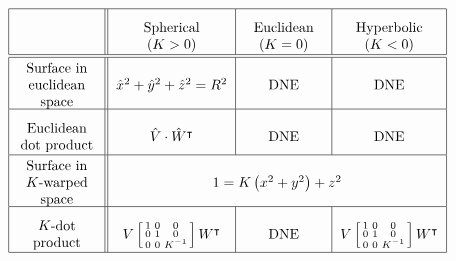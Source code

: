 \documentclass{ximera}
\begin{document}
\[
{\renewcommand{\arraystretch}{2.7}
  \begin{tabular}{|c||c|c|c|}\hline
    & \begin{minipage}{2cm}\begin{center}Spherical ($K>0$)\end{center}\end{minipage} & \begin{minipage}{2cm}\begin{center}Euclidean ($K=0$)\end{center}\end{minipage} & \begin{minipage}{2cm}\begin{center}Hyperbolic ($K<0$)\end{center}\end{minipage}\\\hline\hline
    \begin{minipage}{2cm}\begin{center}Surface in \\ euclidean space\end{center}\end{minipage} & $\hat{x}^{2}+\hat{y}^{2}+\hat{z}^{2}=R^{2}$ & DNE  & DNE \\\hline
    \begin{minipage}{2cm}\begin{center}Euclidean dot product\end{center}\end{minipage} & $\hat{V}\cdot \hat{W}^\transpose$ & DNE  & DNE\\\hline
     \begin{minipage}{2cm}\begin{center}Surface in $K$-warped space\end{center}\end{minipage} & \multicolumn{3}{c|}{$1=K\left(  x^{2}+y^{2}\right)  +z^{2}$}\\\hline
     \begin{minipage}{2cm}\begin{center}$K$-dot product\end{center}\end{minipage} & $V\left[\begin{smallmatrix}1 & 0 & 0\\ 0 & 1 & 0\\ 0 & 0 & K^{-1}\end{smallmatrix}\right] W^\transpose$ &  DNE & $V\left[\begin{smallmatrix}1 & 0 & 0\\ 0 & 1 & 0\\ 0 & 0 & K^{-1}\end{smallmatrix}\right]W^\transpose$\\\hline

\end{tabular}}\]
\end{document}
